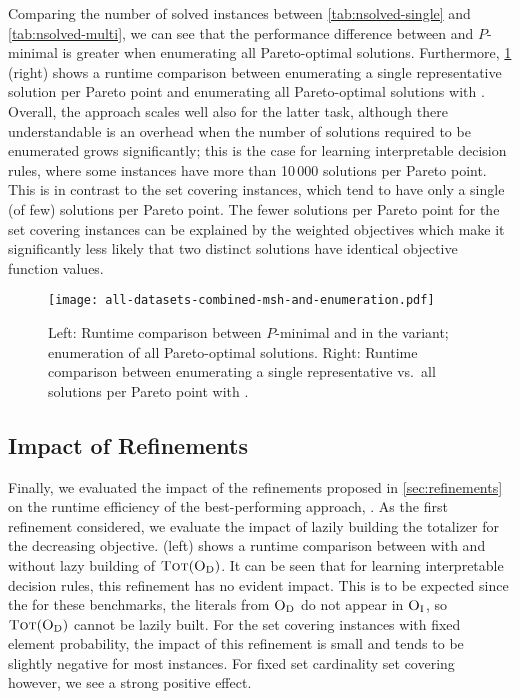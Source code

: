 Comparing the number of solved instances between \cref{tab:nsolved-single} and \cref{tab:nsolved-multi}, we can see that the performance difference between \algname{} and $P$-minimal is greater when enumerating all Pareto-optimal solutions.
Furthermore, \cref{fig:combined-msh-scatter-single-multi} (right) shows a runtime comparison between enumerating a single representative solution per Pareto point and enumerating all Pareto-optimal solutions with \msh{}.
Overall, the approach scales well also for the latter task, although there understandable is an overhead when the number of solutions required to be enumerated grows significantly;
this is the case for learning interpretable decision rules, where some instances have more than 10\,000 solutions per Pareto point.
This is in contrast to the set covering instances, which tend to have only a single (of few) solutions per Pareto point.
The fewer solutions per Pareto point for the set covering instances can be explained by the weighted objectives which make it significantly less likely that two distinct solutions have identical objective function values.

\begin{figure}
  \centering
  \texttt{[image: all-datasets-combined-msh-and-enumeration.pdf]}
  \caption{Left: Runtime comparison between $P$-minimal and \algname{} in the \msh{} variant; 
    enumeration of all Pareto-optimal solutions.
    Right: Runtime comparison between enumerating a single representative vs.\ all solutions per Pareto point with \msh{}.}\label{fig:combined-msh-scatter-single-multi}
\end{figure}

\subsection{Impact of Refinements}

Finally, we evaluated the impact of the refinements proposed in \cref{sec:refinements} on the runtime efficiency of the best-performing approach, \msh{}.
As the first refinement considered, we evaluate the impact of lazily building the totalizer for the decreasing objective.
 (left) shows a runtime comparison between \msh{} with and without lazy building of $\textsc{Tot}(\textsc{O}_{\text{D}})$.
It can be seen that for learning interpretable decision rules, this refinement has no evident impact.
This is to be expected since the for these benchmarks, the literals from $\textsc{O}_{\text{D}}$ do not appear in $\textsc{O}_{\text{I}}$, so $\textsc{Tot}(\textsc{O}_{\text{D}})$ cannot be lazily built.
For the set covering instances with fixed element probability, the impact of this refinement is small and tends to be slightly negative for most instances.
For fixed set cardinality set covering however, we see a strong positive effect.

